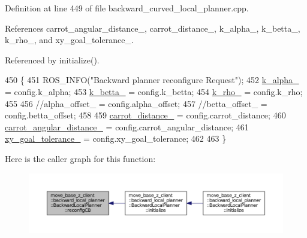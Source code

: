 Definition at line 449 of file backward\+\_\+curved\+\_\+local\+\_\+planner.\+cpp.



References carrot\+\_\+angular\+\_\+distance\+\_\+, carrot\+\_\+distance\+\_\+, k\+\_\+alpha\+\_\+, k\+\_\+betta\+\_\+, k\+\_\+rho\+\_\+, and xy\+\_\+goal\+\_\+tolerance\+\_\+.



Referenced by initialize().


\begin{DoxyCode}
450 \{
451     ROS\_INFO(\textcolor{stringliteral}{"Backward planner reconfigure Request"});
452     \hyperlink{classmove__base__z__client_1_1backward__local__planner_1_1BackwardLocalPlanner_ac859500c0329247de08daf864fd2d4b1}{k\_alpha\_} = config.k\_alpha;
453     \hyperlink{classmove__base__z__client_1_1backward__local__planner_1_1BackwardLocalPlanner_aa2f7fe022cdc4eb11c17f6f576c732c6}{k\_betta\_} = config.k\_betta;
454     \hyperlink{classmove__base__z__client_1_1backward__local__planner_1_1BackwardLocalPlanner_a9ae9a8c4c4663a999ba107aea9f6868d}{k\_rho\_} = config.k\_rho;
455 
456     \textcolor{comment}{//alpha\_offset\_ = config.alpha\_offset;}
457     \textcolor{comment}{//betta\_offset\_ = config.betta\_offset;}
458 
459     \hyperlink{classmove__base__z__client_1_1backward__local__planner_1_1BackwardLocalPlanner_a6dc3aa0ff63f9f7d0aae852755734b5d}{carrot\_distance\_} = config.carrot\_distance;
460     \hyperlink{classmove__base__z__client_1_1backward__local__planner_1_1BackwardLocalPlanner_a3d6cba0748b85a67f5dfd7740de9530f}{carrot\_angular\_distance\_} = config.carrot\_angular\_distance;
461     \hyperlink{classmove__base__z__client_1_1backward__local__planner_1_1BackwardLocalPlanner_a89ab1ee7283a474dc19970789f51c087}{xy\_goal\_tolerance\_} = config.xy\_goal\_tolerance;
462     
463 \}
\end{DoxyCode}


Here is the caller graph for this function\+:
\nopagebreak
\begin{figure}[H]
\begin{center}
\leavevmode
\includegraphics[width=350pt]{classmove__base__z__client_1_1backward__local__planner_1_1BackwardLocalPlanner_a9dfe3fd3fd7a0c8ec414a78e1300d09c_icgraph}
\end{center}
\end{figure}


